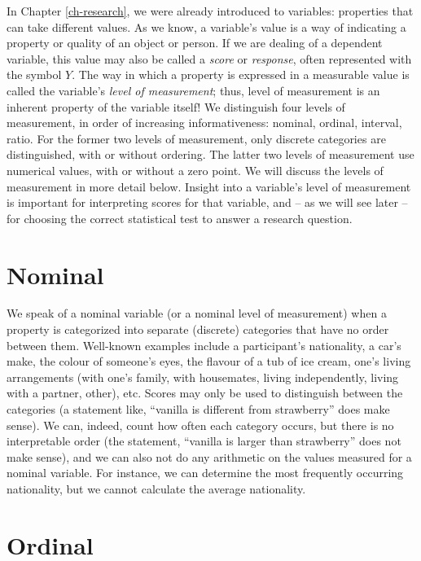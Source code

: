 \documentclass[
]{book}
\begin{document}
In Chapter \ref{ch-research}, we were already introduced to variables: properties that can take different values. As we know, a variable's value is a way of indicating a property or quality of an object or person. If we are dealing of a dependent variable, this value may also be called a \emph{score} or \emph{response}, often represented with the symbol \(Y\). The way in which a property is expressed in a measurable value is called the variable's \emph{level of measurement}; thus, level of measurement is an inherent property of the variable itself! We distinguish four levels of measurement, in order of increasing informativeness: nominal, ordinal, interval, ratio. For the former two levels of measurement, only discrete categories are distinguished, with or without ordering. The latter two levels of measurement use numerical values, with or without a zero point. We will discuss the levels of measurement in more detail below. Insight into a variable's level of measurement is important for interpreting scores for that variable, and -- as we will see later -- for choosing the correct statistical test to answer a research question.

\hypertarget{sec:nominal}{%
\section{Nominal}\label{sec:nominal}}

We speak of a nominal variable (or a nominal level of measurement) when a property is categorized into separate (discrete) categories that have no order between them. Well-known examples include a participant's nationality, a car's make, the colour of someone's eyes, the flavour of a tub of ice cream, one's living arrangements (with one's family, with housemates, living independently, living with a partner, other), etc. Scores may only be used to distinguish between the categories (a statement like, ``vanilla is different from strawberry'' does make sense). We can, indeed, count how often each category occurs, but there is no interpretable order (the statement, ``vanilla is larger than strawberry'' does not make sense), and we can also not do any arithmetic on the values measured for a nominal variable. For instance, we can determine the most frequently occurring nationality, but we cannot calculate the average nationality.

\hypertarget{sec:ordinal}{%
\section{Ordinal}\label{sec:ordinal}}
\end{document}
